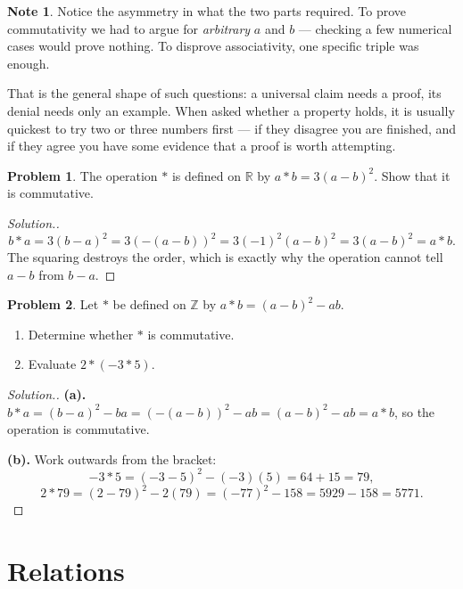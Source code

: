 \documentclass[11pt,a4paper]{article}
\theoremstyle{definition}
\newtheorem{note}[thm]{Note}
\newtheorem{problemx}{Problem}[section]
\newenvironment{problem}{\begin{problemx}}{\end{problemx}}
\newenvironment{solution}
  {\renewcommand{\qedsymbol}{}\begin{proof}[\textit{Solution}.]}
  {\end{proof}}
\begin{document}
\begin{note}
Notice the asymmetry in what the two parts required. To prove commutativity we had
to argue for \emph{arbitrary} $a$ and $b$ --- checking a few numerical cases would
prove nothing. To disprove associativity, one specific triple was enough.

That is the general shape of such questions: a universal claim needs a proof, its
denial needs only an example. When asked whether a property holds, it is usually
quickest to try two or three numbers first --- if they disagree you are finished,
and if they agree you have some evidence that a proof is worth attempting.
\end{note}

\begin{problem}
The operation $*$ is defined on $\mathbb{R}$ by $a*b=3(a-b)^{2}$. Show that it is
commutative.
\end{problem}

\begin{solution}
$$b*a=3(b-a)^{2}=3\left(-(a-b)\right)^{2}=3(-1)^{2}(a-b)^{2}=3(a-b)^{2}=a*b .$$
The squaring destroys the order, which is exactly why the operation cannot tell
$a-b$ from $b-a$.
\end{solution}

\pagebreak

\begin{problem}
Let $*$ be defined on $\mathbb{Z}$ by $a*b=(a-b)^{2}-ab$.
\begin{enumerate}
\item[(a).] Determine whether $*$ is commutative.
\item[(b).] Evaluate $2*(-3*5)$.
\end{enumerate}
\end{problem}

\begin{solution}
\textbf{(a).} $b*a=(b-a)^{2}-ba=\left(-(a-b)\right)^{2}-ab=(a-b)^{2}-ab=a*b$, so
the operation is commutative.

\textbf{(b).} Work outwards from the bracket:
$$-3*5=(-3-5)^{2}-(-3)(5)=64+15=79,$$
$$2*79=(2-79)^{2}-2(79)=(-77)^{2}-158=5929-158=5771 .$$
\end{solution}

\section{Relations}
\end{document}

